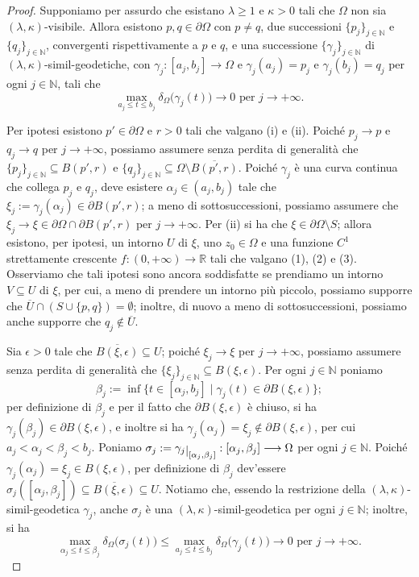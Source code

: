 \begin{proof}
    Supponiamo per assurdo che esistano $\lambda \ge 1$ e $\kappa>0$ tali che $\Omega$ non sia $(\lambda,\kappa)$-visibile. Allora esistono $p,q\in\partial\Omega$ con $p\not=q$, due successioni $\{p_j\}_{j\in\mathbb{N}}$ e $\{q_j\}_{j\in\mathbb{N}}$, convergenti rispettivamente a $p$ e $q$, e una successione $\{\gamma_j\}_{j\in\mathbb{N}}$ di $(\lambda,\kappa)$-simil-geodetiche, con $\gamma_j:[a_j,b_j]\longrightarrow\Omega$ e $\gamma_j(a_j)=p_j$ e $\gamma_j(b_j)=q_j$ per ogni $j\in\mathbb{N}$, tali che
    $$\max_{a_j\le t\le b_j}\delta_\Omega\big(\gamma_j(t)\big)\longrightarrow 0\text{ per }j\longrightarrow+\infty.$$

    Per ipotesi esistono $p'\in\partial\Omega$ e $r>0$ tali che valgano (i) e (ii). Poiché $p_j\longrightarrow p$ e $q_j\longrightarrow q$ per $j\longrightarrow+\infty$, possiamo assumere senza perdita di generalità che $\{p_j\}_{j\in\mathbb{N}}\subseteq B(p',r)$ e $\{q_j\}_{j\in\mathbb{N}}\subseteq \Omega\setminus\overline{B(p',r)}$. Poiché $\gamma_j$ è una curva continua che collega $p_j$ e $q_j$, deve esistere $\alpha_j\in(a_j,b_j)$ tale che $\xi_j:=\gamma_j(\alpha_j)\in\partial B(p',r)$; a meno di sottosuccessioni, possiamo assumere che $\xi_j\longrightarrow\xi\in\partial\Omega\cap\partial B(p',r)$ per $j\longrightarrow+\infty$. Per (ii) si ha che $\xi\in\partial\Omega\setminus S$; allora esistono, per ipotesi, un intorno $U$ di $\xi$, uno $z_0\in\Omega$ e una funzione $C^1$ strettamente crescente $f:(0,+\infty)\longrightarrow\mathbb{R}$ tali che valgano (1), (2) e (3). Osserviamo che tali ipotesi sono ancora soddisfatte se prendiamo un intorno $V \subseteq U$ di $\xi$, per cui, a meno di prendere un intorno più piccolo, possiamo supporre che $\overline{U}\cap(S\cup\{p,q\})=\emptyset$; inoltre, di nuovo a meno di sottosuccessioni, possiamo anche supporre che $q_j\not\in\overline{U}$.

    Sia $\epsilon>0$ tale che $\overline{B(\xi,\epsilon)}\subseteq U$; poiché $\xi_j\longrightarrow \xi$ per $j\longrightarrow+\infty$, possiamo assumere senza perdita di generalità che $\{\xi_j\}_{j\in\mathbb{N}}\subseteq B(\xi,\epsilon)$. Per ogni $j\in\mathbb{N}$ poniamo
    $$\beta_j:=\inf\{t\in[\alpha_j,b_j]\mid \gamma_j(t)\in\partial B(\xi,\epsilon)\};$$
    per definizione di $\beta_j$ e per il fatto che $\partial B(\xi,\epsilon)$ è chiuso, si ha $\gamma_j(\beta_j)\in\partial B(\xi,\epsilon)$, e inoltre si ha $\gamma_j(\alpha_j)=\xi_j\not\in\partial B(\xi,\epsilon)$, per cui $a_j<\alpha_j<\beta_j<b_j$. Poniamo $\sigma_j:=\gamma_j\restrict{[\alpha_j,\beta_j]}:[\alpha_j,\beta_j]\longrightarrow\Omega$ per ogni $j\in\mathbb{N}$. Poiché $\gamma_j(\alpha_j)=\xi_j\in B(\xi,\epsilon)$, per definizione di $\beta_j$ dev'essere $\sigma_j([\alpha_j,\beta_j])\subseteq\overline{B(\xi,\epsilon)}\subseteq U$. Notiamo che, essendo la restrizione della $(\lambda,\kappa)$-simil-geodetica $\gamma_j$, anche $\sigma_j$ è una $(\lambda,\kappa)$-simil-geodetica per ogni $j\in\mathbb{N}$; inoltre, si ha
    $$\max_{\alpha_j\le t\le \beta_j}\delta_\Omega\big(\sigma_j(t)\big)\le\max_{a_j\le t\le b_j}\delta_\Omega\big(\gamma_j(t)\big)\longrightarrow 0\text{ per }j\longrightarrow+\infty.$$


\end{proof}
